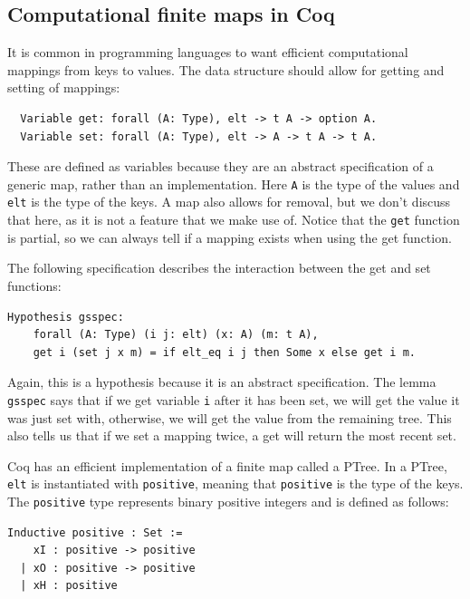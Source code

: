 \documentclass{puthesis}
\begin{document}
\subsection{Computational finite maps in Coq}
\label{sec:ptrees}
It is common in programming languages to want efficient computational
mappings from keys to values. The data structure should allow for
getting and setting of mappings:

\begin{lstlisting}
  Variable get: forall (A: Type), elt -> t A -> option A.
  Variable set: forall (A: Type), elt -> A -> t A -> t A.
\end{lstlisting}

These are defined as variables because they are an abstract
specification of a generic map, rather than an implementation. Here
\lstinline|A| is the type of the values and \lstinline|elt| is the
type of the keys. A map also allows for removal, but we
don't discuss that here, as it is not a feature that we make use
of. Notice that the \lstinline|get| function is partial, so we can
always tell if a mapping exists when using the get function.

The following specification describes the interaction between the get and
set functions:

\begin{lstlisting}
Hypothesis gsspec:
    forall (A: Type) (i j: elt) (x: A) (m: t A),
    get i (set j x m) = if elt_eq i j then Some x else get i m.
\end{lstlisting}

Again, this is a hypothesis because it is an abstract
specification. The lemma \lstinline|gsspec| says that if we get
variable \lstinline|i| after it has been set, we will get the value it
was just set with, otherwise, we will get the value from the remaining
tree. This also tells us that if we set a mapping twice, a get will
return the most recent set.

Coq has an efficient implementation of a finite map called a PTree. In
a PTree, \lstinline|elt| is instantiated with \lstinline|positive|,
meaning that \lstinline|positive| is the type of the keys. The
\lstinline|positive| type represents binary positive integers and is defined as follows:

\begin{lstlisting}
Inductive positive : Set :=
    xI : positive -> positive 
  | xO : positive -> positive 
  | xH : positive
\end{lstlisting}
\end{document}
